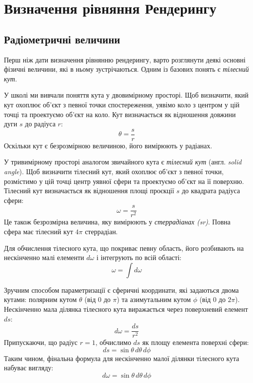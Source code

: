  \section{Визначення рівняння Рендерингу}
   \setcounter{equation}{0}
 \setcounter{theorem}{0}

 \subsection{Радіометричні величини}

Перш ніж дати визначення рівнянню рендерингу, варто розглянути деякі основні фізичні величини, які в ньому зустрічаються. Одним із базових понять є \textit{тілесний кут}.

\par
У школі ми вивчали поняття кута у двовимірному просторі. Щоб визначити, який кут охоплює об’єкт з певної точки спостереження, уявімо коло з центром у цій точці та проектуємо об’єкт на коло. Кут визначається як відношення довжини дуги $s$ до радіуса $r$:
\[
\theta = \frac{s}{r}
\]
Оскільки кут є безрозмірною величиною, його вимірюють у радіанах. 
\par
У тривимірному просторі аналогом звичайного кута є \textit{тілесний кут} (англ. \textit{solid angle}). Щоб визначити тілесний кут, який охоплює об’єкт з певної точки, розмістимо у цій точці центр уявної сфери та проектуємо об’єкт на її поверхню. Тілесний кут визначається як відношення площі проєкції $s$ до квадрата радіуса сфери:
\[
\omega = \frac{s}{r^2}
\]
Це також безрозмірна величина, яку вимірюють у \textit{стеррадіанах (sr)}. Повна сфера має тілесний кут $4\pi$ стеррадіан.

\par
Для обчислення тілесного кута, що покриває певну область, його розбивають на нескінченно малі елементи $d\omega$ і інтегрують по всій області:
\[
\omega = \int d\omega
\]

\par
Зручним способом параметризації є сферичні координати, які задаються двома кутами: полярним кутом $\theta$ (від $0$ до $\pi$) та азимутальним кутом $\phi$ (від $0$ до $2\pi$). Нескінченно мала ділянка тілесного кута виражається через поверхневий елемент $ds$:
\[
d\omega = \frac{ds}{r^2}
\]
Припускаючи, що радіус $r = 1$, обчислимо $ds$ як площу елемента поверхні сфери:
\[
ds = \sin{\theta} \, d\theta \, d\phi
\]
Таким чином, фінальна формула для нескінченно малої ділянки тілесного кута набуває вигляду:
\[
d\omega = \sin{\theta} \, d\theta \, d\phi
\]

